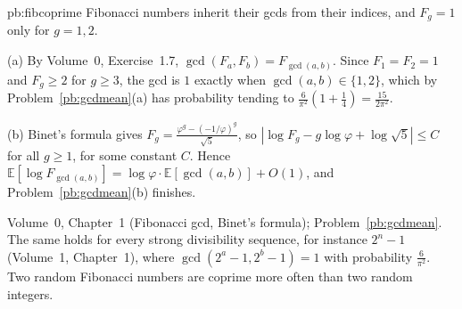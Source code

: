 \begin{solution}{pb:fibcoprime}
\idea Fibonacci numbers inherit their gcds from their indices, and $F_g=1$ only for $g=1,2$.

\writeup (a) By Volume~0, Exercise~1.7, $\gcd(F_a,F_b)=F_{\gcd(a,b)}$. Since $F_1=F_2=1$ and $F_g\ge2$ for $g\ge3$, the gcd is $1$ exactly
when $\gcd(a,b)\in\{1,2\}$, which by Problem~\ref{pb:gcdmean}(a) has probability tending to $\frac6{\pi^2}(1+\frac14)=\frac{15}{2\pi^2}$.

(b) Binet's formula gives $F_g=\frac{\varphi^g-(-1/\varphi)^g}{\sqrt5}$, so $|\log F_g-g\log\varphi+\log\sqrt5|\le C$ for all $g\ge1$,
for some constant $C$. Hence $\mathbb E[\log F_{\gcd(a,b)}]=\log\varphi\cdot\mathbb E[\gcd(a,b)]+O(1)$, and Problem~\ref{pb:gcdmean}(b)
finishes.

\tools Volume~0, Chapter~1 (Fibonacci gcd, Binet's formula); Problem~\ref{pb:gcdmean}.
\leads The same holds for every strong divisibility sequence, for instance $2^n-1$ (Volume~1, Chapter~1), where
$\gcd(2^a-1,2^b-1)=1$ with probability $\frac6{\pi^2}$. Two random Fibonacci numbers are coprime more often than two random integers.
\end{solution}

